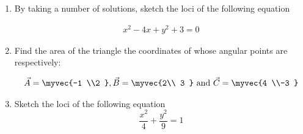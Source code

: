 \renewcommand{\theequation}{\theenumi}
\renewcommand{\thefigure}{\theenumi}
\begin{enumerate}[label=\thesubsection.\arabic*.,ref=\thesubsection.\theenumi]

\item By taking a number of solutions, sketch
the loci of the following equation

\begin{align}\label{4/4/eq:eq1}
    x^{2}-4x +y^{2}+3=0
\end{align}

\solution


\item Find the area of the triangle the coordinates of whose angular points are respectively: 


\begin{align}
\Vec{A} =\myvec{-1 \\2 }, \Vec{B} =\myvec{2\\ 3 }\text{ and } \Vec{C} =\myvec{4 \\-3 }
\end{align}
\solution 

\item Sketch the loci of the following equation
\begin{equation}
\label{4/7/Eq a}
\frac{x^2}{4} + \frac{y^2}{9} = 1
\end{equation}
%
\solution

\end{enumerate}
